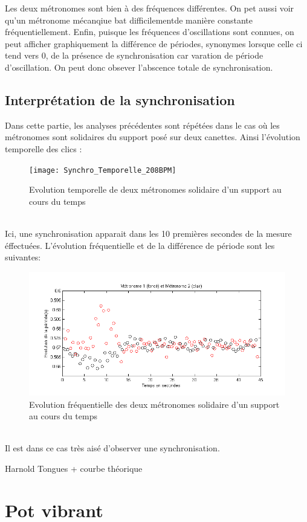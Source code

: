 \documentclass[a4paper,11pt]{report}
\begin{document}
Les deux métronomes sont bien à des fréquences différentes. On pet aussi voir qu'un métronome mécanqiue bat difficilementde manière constante fréquentiellement.
Enfin, puisque les fréquences d'oscillations sont connues, on peut afficher graphiquement la différence de périodes, synonymes lorsque celle ci tend vers 0, de la présence de synchronisation car varation de période d'oscillation. On peut donc obsever l'abscence totale de synchronisation.
\subsection{Interprétation de la synchronisation}
Dans cette partie, les analyses précédentes sont répétées dans le cas où les métronomes sont solidaires du support posé sur deux canettes. Ainsi l'évolution temporelle des clics :
\begin{figure}[h]
\centering
\texttt{[image: Synchro\_Temporelle\_208BPM]}
\caption{Evolution temporelle de deux métronomes solidaire d'un support au cours du temps}\label{SynchronisationT}
\end{figure}\\
Ici, une synchronisation apparait dans les 10 premières secondes de la mesure éffectuées.
L'évolution fréquentielle et de la différence de période sont les suivantes:
\begin{figure}[h]
\centering
\includegraphics[width=1\textwidth]{Synchro_Frequence_208BPM}
\caption{Evolution fréquentielle des deux métronomes solidaire d'un support au cours du temps}\label{Synchronisation}
\end{figure}\\
Il est dans ce cas très aisé d'observer une synchronisation.

Harnold Tongues + courbe théorique

\section{Pot vibrant}
\end{document}
